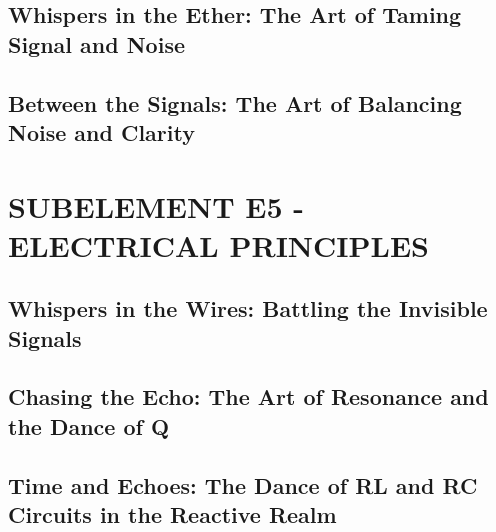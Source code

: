 \documentclass[12pt]{book}
\begin{document}
\section{Whispers in the Ether: The Art of Taming Signal and Noise}














\section{Between the Signals: The Art of Balancing Noise and Clarity}














\chapter{SUBELEMENT E5 - ELECTRICAL PRINCIPLES}
\section{Whispers in the Wires: Battling the Invisible Signals}














\section{Chasing the Echo: The Art of Resonance and the Dance of Q}
\section{Time and Echoes: The Dance of RL and RC Circuits in the Reactive Realm}
\end{document}
